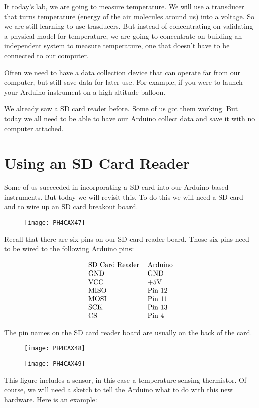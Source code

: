 It today's lab, we are going to measure temperature. We will use a transducer that turns temperature (energy of the air molecules around us) into a voltage. So we are still learning to use trasducers. But instead of concentrating on validating a physical model for temperature, we are going to concentrate on building an independent system to measure temperature, one that doesn't have to be connected to our computer.

Often we need to have a data collection device that can operate far from our computer, but still save data for later use. For example, if you were to launch your Arduino-instrument on a high altitude balloon.

We already saw a SD card reader before. Some of us got them working. But today we all need to be able to have our Arduino collect data and save it with no computer attached.

\section{Using an SD Card Reader}

Some of us succeeded in incorporating a SD card into our Arduino based instruments. But today we will revisit this. To do this we will need a SD card and to wire up an SD card breakout board.\begin{figure}[h!] 
\texttt{[image: PH4CAX47]}
\end{figure}
Recall that there are six pins on our SD card reader board. Those six pins need to be wired to the following Arduino pins:

\begin{equation*}
\begin{tabular}{ll}
SD Card Reader & Arduino \\ 
GND & GND \\ 
VCC & +5V \\ 
MISO & Pin 12 \\ 
MOSI & Pin 11 \\ 
SCK & Pin 13 \\ 
CS & Pin 4%
\end{tabular}%
\end{equation*}

The pin names on the SD card reader board are usually on the back of the card.\begin{figure}[h!]
	
\texttt{[image: PH4CAX48]}
\end{figure} \begin{figure}[h!]
\texttt{[image: PH4CAX49]}
\end{figure}
This figure includes a sensor, in this case a temperature sensing thermistor. Of course, we will need a sketch to tell the Arduino what to do with this new hardware. Here is an example:

